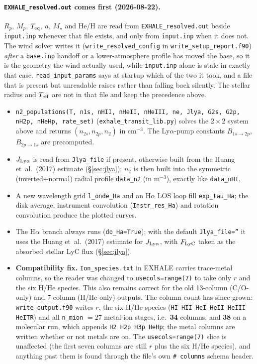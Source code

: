 \documentclass[english,a4paper]{my_memo}
\begin{document}
\paragraph{\texttt{EXHALE\_resolved.out} comes first (2026-08-22).} $R_p$,
$M_p$, $T_{\rm eq}$, $a$, $M_\star$ and He/H are read from
\texttt{EXHALE\_resolved.out} beside \texttt{input.inp} whenever that file
exists, and only from \texttt{input.inp} when it does not. The wind solver
writes it (\texttt{write\_resolved\_config} in
\texttt{write\_setup\_report.f90}) \emph{after} a \texttt{base.inp} handoff or a
lower-atmosphere profile has moved the base, so it is the geometry the wind
actually used, while \texttt{input.inp} alone is stale in exactly that case.
\texttt{read\_input\_params} says at startup which of the two it took, and a
file that is present but unreadable raises rather than falling back silently.
The stellar radius and $T_{\rm eff}$ are not in that file and keep the
precedence above.

\begin{itemize}
  \item \texttt{n2\_populations(T, n1s, nHII, nHeII, nHeIII, ne, Jlya,
    G2s, G2p, nH2p, nHeHp, rate\_set)} (\texttt{exhale\_transit\_lib.py})
    solves the $2\times2$ system above and returns $(n_{2s},n_{2p},n_2)$ in
    cm$^{-3}$. The Ly$\alpha$-pump constants $B_{1s\to2p}$, $B_{2p\to1s}$
    are precomputed.
  \item $J_{\rm Ly\alpha}$ is read from \texttt{Jlya\_file} if present,
    otherwise built from the Huang et~al.~(2017) estimate
    (\S\ref{sec:jlya}); $n_2$ is then built into the symmetric
    (inverted$+$normal) radial profile \texttt{data\_n2} (in m$^{-3}$),
    exactly like \texttt{data\_nHI}.
  \item A new wavelength grid \texttt{l\_onde\_Ha} and an H$\alpha$ LOS
    loop fill \texttt{exp\_tau\_Ha}; the disk average, instrument
    convolution (\texttt{Instr\_res\_Ha}) and rotation convolution
    produce the plotted curves.
  \item The H$\alpha$ branch always runs (\texttt{do\_Ha=True}); with the
    default \texttt{Jlya\_file=''} it uses the Huang et~al.~(2017)
    estimate for $J_{\rm Ly\alpha}$, with $F_{\rm LyC}$ taken as the
    absorbed stellar LyC flux (\S\ref{sec:jlya}).
  \item \textbf{Compatibility fix.} \texttt{Ion\_species.txt} in
    EXHALE carries trace-metal columns, so the
    reader was changed to \texttt{usecols=range(7)} to take only
    $r$ and the six H/He species. This also remains correct for the old
    13-column (C/O-only) and 7-column (H/He-only) outputs.
    The column count has since grown: \texttt{write\_output.f90} writes $r$,
    the six H/He species (\texttt{HI HII HeI HeII HeIII HeITR}) and all
    \texttt{n\_mion} $=27$ metal-ion stages, i.e.\ \textbf{34} columns, and
    \textbf{38} on a molecular run, which appends \texttt{H2 H2p H3p HeHp}; the
    metal columns are written whether or not metals are on. The
    \texttt{usecols=range(7)} slice is unaffected (the first seven columns
    are still $r$ plus the six H/He species), and anything past them is found
    through the file's own \texttt{\# columns} schema header.
\end{itemize}
\end{document}
